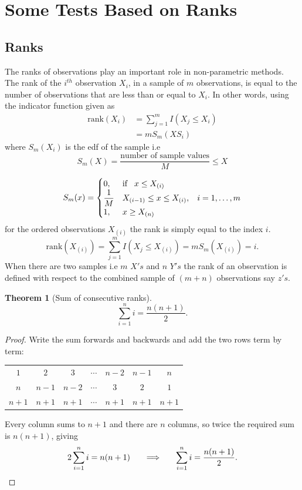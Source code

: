 \documentclass[11pt,a4paper]{article}
\theoremstyle{definition}
\newtheorem{thm}{Theorem}[section]
\begin{document}
\section{Some Tests Based on Ranks}

\subsection{Ranks}
The ranks of observations play an important role in non-parametric methods. The rank of the $i^{th}$ observation $X_i$, in a sample of $m$ observations, is equal to the number of observations that are less than or equal to $X_i$. In other words, using the indicator function given as
\begin{align*}
\text{rank}(X_i) &=\sum^m_{j=1}I(X_j\leq X_i)\\
                 &=mS_m(XS_i)
\end{align*}
where $S_m(X_i)$ is the edf of the sample i.e $$S_m(X)=\frac{\text{number of sample values}}{M}\leq X$$

\[ S_m(x)=
\begin{cases}
0, &\text{if}\hspace{0.3cm} x\leq X_{(i)}\\
\dfrac{1}{M} & X_{(i-1)}\leq x\leq X_{(i)},\hspace{0.3cm} i=1,\dots,m\\
1, &x\geq X_{(n)}\\
\end{cases}
\]
for the ordered observations $X_{(i)}$ the rank is simply equal to the index $i$. $$\text{rank}(X_{(i)})=\sum^m_{j=1}I(X_j\leq X_{(i)})=mS_m(X_{(i)})=i.$$
When there are two samples i.e $m$ $X's$ and $n$ $Y's$ the rank of an observation is defined with respect to the combined sample of $(m+n)$ observations say $z's$.\\




\begin{thm}[Sum of consecutive ranks]
$$\sum^{n}_{i=1}i=\dfrac{n(n+1)}{2}.$$
\end{thm}

\begin{proof}
Write the sum forwards and backwards and add the two rows term by term:

\begin{table}[H]
\centering
\begin{tabular}{ccccccc}
$1$&$2$&$3$&$\cdots$&$n-2$&$n-1$&$n$\\
$n$&$n-1$&$n-2$&$\cdots$&$3$&$2$&$1$\\
\hline
$n+1$&$n+1$&$n+1$&$\cdots$&$n+1$&$n+1$&$n+1$\\
\end{tabular}
\end{table}

Every column sums to $n+1$ and there are $n$ columns, so twice the required sum is
$n(n+1)$, giving
$$2\sum^{n}_{i=1}i=n(n+1)\hspace{0.6cm}\Longrightarrow\hspace{0.6cm}
\sum^{n}_{i=1}i=\dfrac{n(n+1)}{2}.$$
\end{proof}
\end{document}
